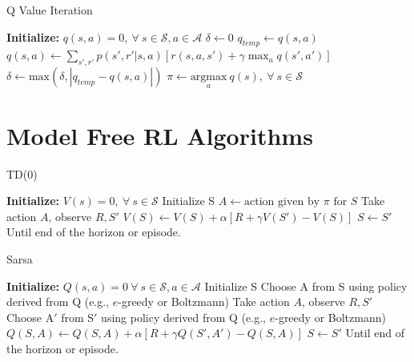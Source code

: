 \documentclass{article}
\newcommand{\mc}{\mathcal}
\begin{document}
\begin{algorithm}[H]
\caption{Q Value Iteration}\label{euclid}
\begin{spacing}{0.8}
\begin{algorithmic}[1]
\State \textbf{Initialize:} $q(s, a) = 0, \ \forall \ s \in \mc{S}, a \in \mc{A}$
\State $\delta \gets 0$ 
\For{$s \in \mc{S}, a \in \mc{A}$}
\State $q_{temp} \gets q(s, a)$
\State $q(s, a) \gets \sum_{s', r'}p(s',r'|s,a)[r(s,a,s') + \gamma \max_a q(s', a')]$
\State $\delta \gets \text{max}(\delta, |q_{temp} - q(s, a)|)$
\EndFor
\If{$\delta < \epsilon$}
\State {}
\EndIf
\EndWhile
\State $\pi \gets \underset{a}{\text{argmax}} \ q(s), \ \forall \ s \in \mc{S}$
\EndProcedure
\end{algorithmic}
\end{spacing}
\end{algorithm}

\section{Model Free RL Algorithms}\label{sec:model_free_appendix}
\begin{algorithm}[H]
\caption{TD(0)}
\begin{spacing}{0.8}
\begin{algorithmic}[1]
\State \textbf{Initialize:} $V(s) = 0, \ \forall \ s \in \mc{S}$
\State Initialize S
\State $A \gets \text{action given by $\pi$ for $S$}$
\State Take action $A$, observe $R, S'$
\State $V(S) \gets V(S) + \alpha[R + \gamma V(S') - V(S)]$
\State $S \gets S'$
\EndFor
\State Until end of the horizon or episode.
\EndFor
\EndProcedure
\end{algorithmic}
\end{spacing}
\end{algorithm}

\begin{algorithm}[H]
\caption{Sarsa}
\begin{spacing}{0.8}
\begin{algorithmic}[1]
\State \textbf{Initialize:} $Q(s, a) = 0 \ \forall \ s \in \mc{S}, a \in \mc{A}$
\State Initialize S
\State Choose A from S using policy derived from Q (e.g., $e$-greedy or Boltzmann)
\State Take action $A$, observe $R, S'$
\State Choose A$'$ from S$'$ using policy derived from Q (e.g., $e$-greedy or Boltzmann)
\State $Q(S, A) \gets Q(S, A) + \alpha[R + \gamma Q(S', A') - Q(S, A)]$
\State $S \gets S'$
\EndFor
\State Until end of the horizon or episode.
\EndFor
\EndProcedure
\end{algorithmic}
\end{spacing}
\end{algorithm}
\end{document}
